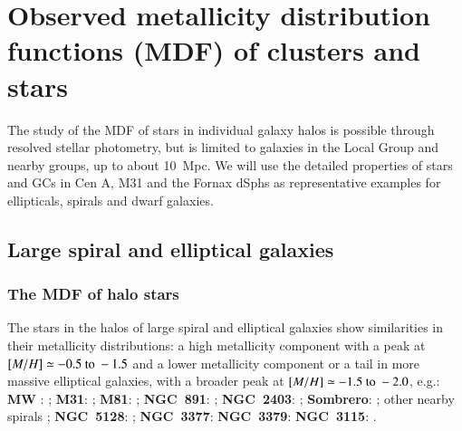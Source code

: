 \documentclass{aa}
\begin{document}
\section{Observed metallicity distribution functions (MDF) of clusters and stars} \label{sec:obs}


The study of the MDF of stars in individual 
galaxy halos is possible through resolved stellar photometry, but is 
limited to galaxies in the Local Group and nearby groups, up to about 10~Mpc. 
We will use the detailed properties of stars and GCs in Cen A, M31 and the Fornax dSphs as representative examples for ellipticals, spirals and dwarf galaxies.

\subsection{Large spiral and elliptical galaxies} \label{sec:obs:spirals}

 

\subsubsection{The MDF of halo stars} \label{sec:2.1.1}

The stars in the halos of large spiral and elliptical galaxies show similarities in their metallicity distributions:
a high metallicity component with a peak at $[M/H] \simeq -0.5~ {\rm to}~ -1.5$ and a lower metallicity component or a tail in more massive elliptical galaxies, with a broader peak at $[M/H] \simeq  -1.5~ {\rm to}~-2.0$, e.g.:  
{\bf MW} : \citep{ryan91,an12};
{\bf M31}: \citep{durrell01,durrell04,chapman06,kalirai06, gilbert14, ibata14, gregersen15}; 
{\bf M81}: \citep{durrell10};
{\bf NGC~891}: \citep{mouhcine07,rejkuba09}; 
{\bf NGC~2403}: \citep{barker12}; 
{\bf Sombrero}: \citep{mould10}; 
 other nearby spirals \citep[e.g.][]{mouhcine05,mouhcine06}; 
{\bf NGC~5128}: \citep{harris99, harris00, harrisharris02,rejkuba05, crnojevic13, rejkuba14};
{\bf NGC~3377}: \citep{harris07b}
{\bf NGC~3379}: \citep{harris07a,leejang16}
{\bf NGC~3115}: \citep{peacock15}.
\end{document}
